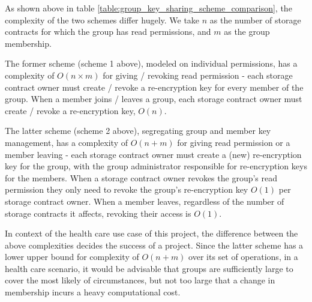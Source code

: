 As shown above in table \ref{table:group_key_sharing_scheme_comparison}, the complexity of the two schemes differ hugely. We take $n$ as the number of storage contracts for which the group has read permissions, and $m$ as the group membership. 

The former scheme (scheme 1 above), modeled on individual permissions, has a complexity of $O(n \times m)$ for giving / revoking read permission - each storage contract owner must create / revoke a re-encryption key for every member of the group. When a member joins / leaves a group, each storage contract owner must create / revoke a re-encryption key, $O(n)$.

The latter scheme (scheme 2 above), segregating group and member key management, has a complexity of $O(n + m)$ for giving read permission or a member leaving - each storage contract owner must create a (new) re-encryption key for the group, with the group administrator responsible for re-encryption keys for the members. When a storage contract owner revokes the group's read permission they only need to revoke the group's re-encryption key $O(1)$ per storage contract owner. When a member leaves, regardless of the number of storage contracts it affects, revoking their access is $O(1)$.

In context of the health care use case of this project, the difference between the above complexities decides the success of a project. Since the latter scheme has a lower upper bound for complexity of $O(n + m)$ over its set of operations, in a health care scenario, it would be advisable that groups are sufficiently large to cover the most likely of circumstances, but not too large that a change in membership incurs a heavy computational cost.

